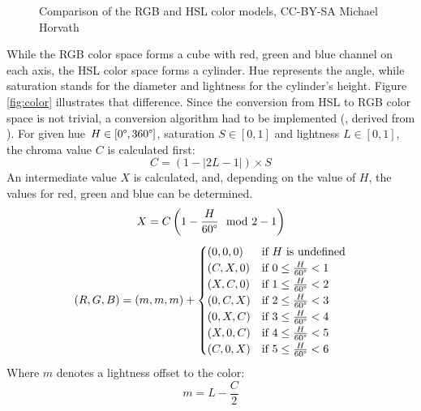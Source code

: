 \begin{figure}[bth]
	\myfloatalign
	 \quad
	\caption{Comparison of the RGB and \ac{HSL} color models, CC-BY-SA Michael Horvath}
\end{figure}

While the RGB color space forms a cube with red, green and blue channel on each axis, the \ac{HSL} color space forms a cylinder. Hue represents the angle, while saturation stands for the diameter and lightness for the cylinder's height. Figure \ref{fig:color} illustrates that difference. Since the conversion from \ac{HSL} to RGB color space is not trivial, a conversion algorithm had to be implemented (\cite{qwertie}, derived from \cite{graphicsgems}). For given hue $H\in \left[ 0\degree , 360\degree \right]$, saturation $S\in \left[ 0, 1\right]$ and lightness $L\in \left[ 0, 1\right]$, the chroma value $C$ is calculated first:
\[
C = \left( 1 - \left| 2L-1\right| \right) \times S
\]
An intermediate value $X$ is calculated, and, depending on the value of $H$, the values for red, green and blue can be determined.
\[
X = C\left( 1 - \frac{H}{60\degree} \mod{2} - 1\right)
\]
\[
\left(R, G, B\right) = \left(m, m, m\right) + 
\begin{cases}
(0, 0, 0) &\mbox{if } H \mbox{ is undefined} \\
(C, X, 0) &\mbox{if } 0 \leq \frac{H}{60\degree} < 1 \\
(X, C, 0) &\mbox{if } 1 \leq \frac{H}{60\degree} < 2 \\
(0, C, X) &\mbox{if } 2 \leq \frac{H}{60\degree} < 3 \\
(0, X, C) &\mbox{if } 3 \leq \frac{H}{60\degree} < 4 \\
(X, 0, C) &\mbox{if } 4 \leq \frac{H}{60\degree} < 5 \\
(C, 0, X) &\mbox{if } 5 \leq \frac{H}{60\degree} < 6
\end{cases}
\]
Where $m$ denotes a lightness offset to the color:
\[
m = L - \frac{C}{2}
\]

